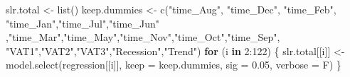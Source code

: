 \documentclass[
]{article}
\newenvironment{Shaded}{\begin{snugshade}}{\end{snugshade}}
\newcommand{\AttributeTok}[1]{\textcolor[rgb]{0.77,0.63,0.00}{#1}}
\newcommand{\ControlFlowTok}[1]{\textcolor[rgb]{0.13,0.29,0.53}{\textbf{#1}}}
\newcommand{\DecValTok}[1]{\textcolor[rgb]{0.00,0.00,0.81}{#1}}
\newcommand{\FloatTok}[1]{\textcolor[rgb]{0.00,0.00,0.81}{#1}}
\newcommand{\FunctionTok}[1]{\textcolor[rgb]{0.00,0.00,0.00}{#1}}
\newcommand{\NormalTok}[1]{#1}
\newcommand{\OtherTok}[1]{\textcolor[rgb]{0.56,0.35,0.01}{#1}}
\newcommand{\SpecialCharTok}[1]{\textcolor[rgb]{0.00,0.00,0.00}{#1}}
\newcommand{\StringTok}[1]{\textcolor[rgb]{0.31,0.60,0.02}{#1}}
\begin{document}
\begin{Shaded}
\begin{Highlighting}[]
\NormalTok{slr.total }\OtherTok{\textless{}{-}} \FunctionTok{list}\NormalTok{()}
\NormalTok{keep.dummies }\OtherTok{\textless{}{-}} \FunctionTok{c}\NormalTok{(}\StringTok{"time\_Aug"}\NormalTok{,}
                  \StringTok{"time\_Dec"}\NormalTok{, }\StringTok{"time\_Feb"}\NormalTok{, }\StringTok{"time\_Jan"}\NormalTok{,}\StringTok{"time\_Jul"}\NormalTok{,}\StringTok{"time\_Jun"}\NormalTok{ ,}\StringTok{"time\_Mar"}\NormalTok{,}\StringTok{"time\_May"}\NormalTok{,}\StringTok{"time\_Nov"}\NormalTok{,}\StringTok{"time\_Oct"}\NormalTok{,}\StringTok{"time\_Sep"}\NormalTok{,}
                  \StringTok{"VAT1"}\NormalTok{,}\StringTok{"VAT2"}\NormalTok{,}\StringTok{"VAT3"}\NormalTok{,}\StringTok{"Recession"}\NormalTok{,}\StringTok{"Trend"}\NormalTok{)}
\ControlFlowTok{for}\NormalTok{ (i }\ControlFlowTok{in} \DecValTok{2}\SpecialCharTok{:}\DecValTok{122}\NormalTok{) \{}
\NormalTok{  slr.total[[i]] }\OtherTok{\textless{}{-}} \FunctionTok{model.select}\NormalTok{(regression[[i]], }\AttributeTok{keep =}\NormalTok{ keep.dummies, }\AttributeTok{sig =} \FloatTok{0.05}\NormalTok{, }\AttributeTok{verbose =}\NormalTok{ F)}
\NormalTok{\}}
\end{Highlighting}
\end{Shaded}
\end{document}
